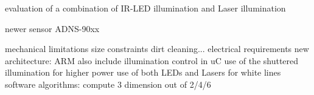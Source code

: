\documentclass[12pt,a4paper]{article}
\begin{document}
  evaluation of a combination of IR-LED illumination and Laser illumination

  newer sensor ADNS-90xx

  mechanical limitations
    size constraints
    dirt cleaning...
  electrical requirements
    new architecture: ARM
    also include illumination control in uC
      use of the shuttered illumination for higher power 
      use of both LEDs and Lasers for white lines
  software algorithms: compute 3 dimension out of 2/4/6




\label{Bibliography}


%
\end{document}

